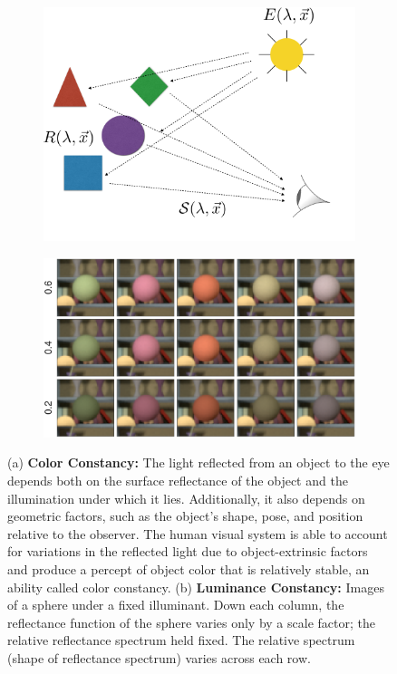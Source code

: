 \documentclass{jov}
\begin{document}
\begin{figure}
\centering
\begin{subfigure}{0.4 \textwidth}
	\centering
	\caption{}
        \includegraphics[width=\textwidth]{../FiguresDraft4/Figure1/Figure1_a.png}
        \label{fig:introSchematic}
    \end{subfigure}
    \begin{subfigure}{0.55 \textwidth}   
        \caption{}    
        \includegraphics[width=\textwidth]{../FiguresDraft4/Figure1/Figure1_b.png}
        \label{fig:introExampleFigure}
    \end{subfigure}
    \label{introFigure}
    \caption{(a) {\bf Color Constancy:} The light reflected from an object to the eye depends both on the surface reflectance of the object and the illumination under which it lies. Additionally, it also depends on geometric factors, such as the object's shape, pose, and position relative to the observer. The human visual system is able to account for variations in the reflected light due to object-extrinsic factors and produce a percept of object color that is relatively stable, an ability called color constancy. (b) {\bf Luminance Constancy:} Images of a sphere under a fixed illuminant.  Down each column, the reflectance function of the sphere varies only by a scale factor; the relative reflectance spectrum held fixed.  The relative spectrum (shape of reflectance spectrum) varies across each row.
}
\end{figure}
\end{document}
